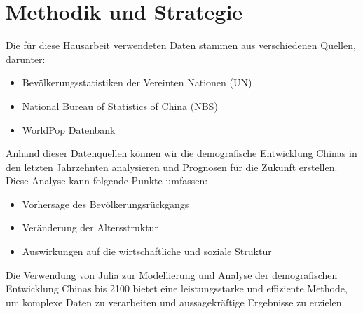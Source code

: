 \section{Methodik und Strategie}

Die für diese Hausarbeit verwendeten Daten stammen aus verschiedenen Quellen, darunter:
\begin{itemize}
\item Bevölkerungsstatistiken der Vereinten Nationen (UN)
\item National Bureau of Statistics of China (NBS)
\item WorldPop Datenbank
\end{itemize}

Anhand dieser Datenquellen können wir die demografische Entwicklung Chinas in den letzten Jahrzehnten analysieren und Prognosen für die Zukunft erstellen.  Diese Analyse kann folgende Punkte umfassen:
\begin{itemize}
\item Vorhersage des Bevölkerungsrückgangs
\item Veränderung der Altersstruktur
\item Auswirkungen auf die wirtschaftliche und soziale Struktur
\end{itemize}
Die Verwendung von Julia zur Modellierung und Analyse der demografischen Entwicklung Chinas bis 2100 bietet eine leistungsstarke und effiziente Methode, um komplexe Daten zu verarbeiten und aussagekräftige Ergebnisse zu erzielen.